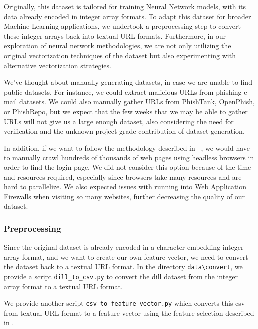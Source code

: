 \documentclass{article}
\begin{document}
    Originally, this dataset is tailored for training Neural Network models, with its data already encoded in integer array formats.
    To adapt this dataset for broader Machine Learning applications, we undertook a preprocessing step to convert these integer arrays back into textual URL formats.
    Furthermore, in our exploration of neural network methodologies, we are not only utilizing the original vectorization techniques of the dataset but also experimenting with alternative vectorization strategies.

    We've thought about manually generating datasets, in case we are unable to find public datasets.
    For instance, we could extract malicious URLs from phishing e-mail datasets.
    We could also manually gather URLs from PhishTank, OpenPhish, or PhishRepo, but we expect that the few weeks that we may be able to gather URLs will not give us a large enough dataset, also considering the need for verification and the unknown project grade contribution of dataset generation.

    In addition, if we want to follow the methodology described in ~\cite{PhishingLoginURLDetection}, we would have to manually crawl hundreds of thousands of web pages using headless browsers in order to find the login page.
    We did not consider this option because of the time and resources required, especially since browsers take many resources and are hard to parallelize.
    We also expected issues with running into Web Application Firewalls when visiting so many websites, further decreasing the quality of our dataset.

    \subsubsection{Preprocessing}\label{subsubsec:preprocessing}
    Since the original dataset is already encoded in a character embedding integer array format, and we want to create our own feature vector, we need to convert the dataset back to a textual URL format.
    In the directory \texttt{data\textbackslash convert}, we provide a script \texttt{dill\_to\_csv.py} to convert the dill dataset from the integer array format to a textual URL format.

    We provide another script \texttt{csv\_to\_feature\_vector.py} which converts this csv from textual URL format to a feature vector using the feature selection described in .
\end{document}
